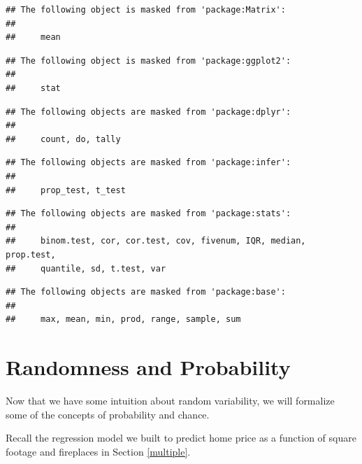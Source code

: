 \documentclass[
]{book}
\newenvironment{Shaded}{\begin{snugshade}}{\end{snugshade}}
\newcommand{\DataTypeTok}[1]{\textcolor[rgb]{0.13,0.29,0.53}{#1}}
\newcommand{\DecValTok}[1]{\textcolor[rgb]{0.00,0.00,0.81}{#1}}
\newcommand{\FloatTok}[1]{\textcolor[rgb]{0.00,0.00,0.81}{#1}}
\newcommand{\KeywordTok}[1]{\textcolor[rgb]{0.13,0.29,0.53}{\textbf{#1}}}
\newcommand{\NormalTok}[1]{#1}
\newcommand{\OperatorTok}[1]{\textcolor[rgb]{0.81,0.36,0.00}{\textbf{#1}}}
\newcommand{\StringTok}[1]{\textcolor[rgb]{0.31,0.60,0.02}{#1}}
\begin{document}
\begin{verbatim}
## The following object is masked from 'package:Matrix':
## 
##     mean
\end{verbatim}

\begin{verbatim}
## The following object is masked from 'package:ggplot2':
## 
##     stat
\end{verbatim}

\begin{verbatim}
## The following objects are masked from 'package:dplyr':
## 
##     count, do, tally
\end{verbatim}

\begin{verbatim}
## The following objects are masked from 'package:infer':
## 
##     prop_test, t_test
\end{verbatim}

\begin{verbatim}
## The following objects are masked from 'package:stats':
## 
##     binom.test, cor, cor.test, cov, fivenum, IQR, median, prop.test,
##     quantile, sd, t.test, var
\end{verbatim}

\begin{verbatim}
## The following objects are masked from 'package:base':
## 
##     max, mean, min, prod, range, sample, sum
\end{verbatim}

\hypertarget{randomness-and-probability}{%
\chapter{Randomness and Probability}\label{randomness-and-probability}}

Now that we have some intuition about random variability, we will formalize some of the concepts of probability and chance.

Recall the regression model we built to predict home price as a function of square footage and fireplaces in Section \ref{multiple}.

\begin{Shaded}
\end{Shaded}
\end{document}
